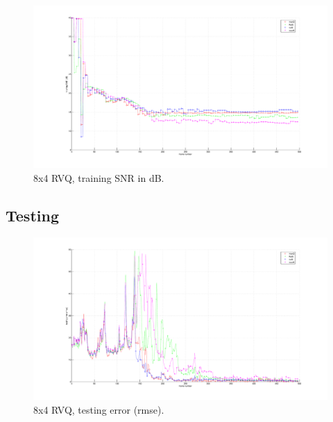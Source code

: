 								\begin{figure}[h!]
								\centering
								\includegraphics[height=0.4\textheight]{thesis/4_trellis70_8_4_1000_trg_SNRdB.pdf}
								\caption{8x4 RVQ, training SNR in dB.}
								\label{fig:4_trellis70_8_4_1000_trg_SNRdB}
								\end{figure}
\clearpage
\newpage
\subsection{Testing}
								\begin{figure}[h!]
								\centering
								\includegraphics[height=0.4\textheight]{thesis/4_trellis70_8_4_1000_tst_rmse.pdf}
								\caption{8x4 RVQ, testing error (rmse).}
								\label{fig:4_trellis70_8_4_1000_tst_rmse}
								\end{figure}


